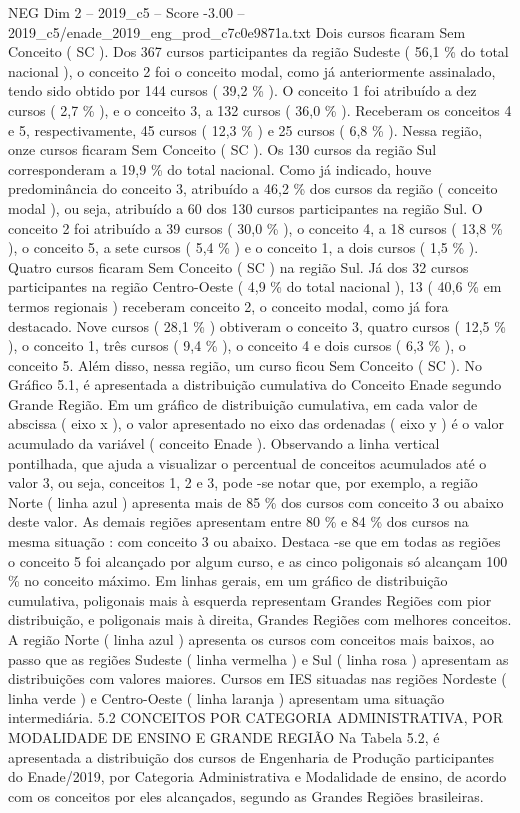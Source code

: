 \begin{textsample}{NEG Dim 2 – 2019\_c5 – Score -3.00 – 2019\_c5/enade\_2019\_eng\_prod\_c7c0e9871a.txt}
Dois cursos ficaram Sem Conceito ( SC ).
Dos 367 cursos participantes da região Sudeste ( 56,1 \% do total nacional ), o conceito 2 foi o conceito modal, como já anteriormente assinalado, tendo sido obtido por 144 cursos ( 39,2 \% ).
O conceito 1 foi atribuído a dez cursos ( 2,7 \% ), e o conceito 3, a 132 cursos ( 36,0 \% ).
Receberam os conceitos 4 e 5, respectivamente, 45 cursos ( 12,3 \% ) e 25 cursos ( 6,8 \% ).
Nessa região, onze cursos ficaram Sem Conceito ( SC ).
Os 130 cursos da região Sul corresponderam a 19,9 \% do total nacional.
Como já indicado, houve predominância do conceito 3, atribuído a 46,2 \% dos cursos da região ( conceito modal ), ou seja, atribuído a 60 dos 130 cursos participantes na região Sul.
O conceito 2 foi atribuído a 39 cursos ( 30,0 \% ), o conceito 4, a 18 cursos ( 13,8 \% ), o conceito 5, a sete cursos ( 5,4 \% ) e o conceito 1, a dois cursos ( 1,5 \% ).
Quatro cursos ficaram Sem Conceito ( SC ) na região Sul.
Já dos 32 cursos participantes na região Centro-Oeste ( 4,9 \% do total nacional ), 13 ( 40,6 \% em termos regionais ) receberam conceito 2, o conceito modal, como já fora destacado.
Nove cursos ( 28,1 \% ) obtiveram o conceito 3, quatro cursos ( 12,5 \% ), o conceito 1, três cursos ( 9,4 \% ), o conceito 4 e dois cursos ( 6,3 \% ), o conceito 5.
Além disso, nessa região, um curso ficou Sem Conceito ( SC ).
No Gráfico 5.1, é apresentada a distribuição cumulativa do Conceito Enade segundo Grande Região.
Em um gráfico de distribuição cumulativa, em cada valor de abscissa ( eixo x ), o valor apresentado no eixo das ordenadas ( eixo y ) é o valor acumulado da variável ( conceito Enade ).
Observando a linha vertical pontilhada, que ajuda a visualizar o percentual de conceitos acumulados até o valor 3, ou seja, conceitos 1, 2 e 3, pode -se notar que, por exemplo, a região Norte ( linha azul ) apresenta mais de 85 \% dos cursos com conceito 3 ou abaixo deste valor.
As demais regiões apresentam entre 80 \% e 84 \% dos cursos na mesma situação : com conceito 3 ou abaixo.
Destaca -se que em todas as regiões o conceito 5 foi alcançado por algum curso, e as cinco poligonais só alcançam 100 \% no conceito máximo.
Em linhas gerais, em um gráfico de distribuição cumulativa, poligonais mais à esquerda representam Grandes Regiões com pior distribuição, e poligonais mais à direita, Grandes Regiões com melhores conceitos.
A região Norte ( linha azul ) apresenta os cursos com conceitos mais baixos, ao passo que as regiões Sudeste ( linha vermelha ) e Sul ( linha rosa ) apresentam as distribuições com valores maiores.
Cursos em IES situadas nas regiões Nordeste ( linha verde ) e Centro-Oeste ( linha laranja ) apresentam uma situação intermediária. 5.2 CONCEITOS POR CATEGORIA ADMINISTRATIVA, POR MODALIDADE DE ENSINO E GRANDE REGIÃO Na Tabela 5.2, é apresentada a distribuição dos cursos de Engenharia de Produção participantes do Enade/2019, por Categoria Administrativa e Modalidade de ensino, de acordo com os conceitos por eles alcançados, segundo as Grandes Regiões brasileiras.

\end{textsample}

